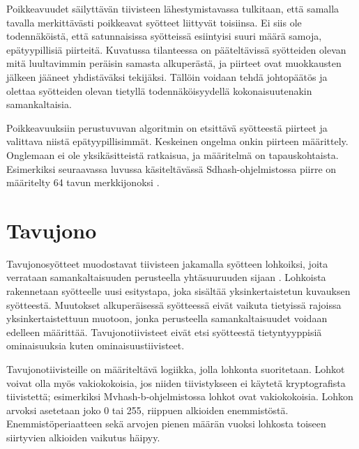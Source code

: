 Poikkeavuudet säilyttävän tiivisteen lähestymistavassa tulkitaan,
että samalla tavalla merkittävästi poikkeavat syötteet liittyvät
toisiinsa. Ei siis ole todennäköistä, että satunnaisissa syötteissä
esiintyisi suuri määrä samoja, epätyypillisiä piirteitä. Kuvatussa
tilanteessa on pääteltävissä syötteiden olevan mitä luultavimmin
peräisin samasta alkuperästä, ja piirteet ovat muokkausten jälkeen
jääneet yhdistäväksi tekijäksi. Tällöin voidaan tehdä johtopäätös
ja olettaa syötteiden olevan tietyllä todennäköisyydellä
kokonaisuutenakin samankaltaisia.

Poikkeavuuksiin perustuvuvan algoritmin on etsittävä
syötteestä piirteet ja valittava niistä epätyypillisimmät.
Keskeinen ongelma onkin piirteen määrittely. Onglemaan
ei ole yksikäsitteistä ratkaisua, ja määritelmä
on tapauskohtaista. Esimerkiksi seuraavassa luvussa
käsiteltävässä Sdhash-ohjelmistossa piirre on määritelty
64 tavun merkkijonoksi \citep{roussev10}.


\section{Tavujono}

Tavujonosyötteet muodostavat tiivisteen jakamalla syötteen lohkoiksi,
joita verrataan samankaltaisuuden perusteella yhtäsuuruuden sijaan
\parencite{martin-perez21}.
Lohkoista rakennetaan syötteelle uusi esitystapa, joka sisältää
yksinkertaistetun kuvauksen syötteestä. Muutokset alkuperäisessä
syötteessä eivät vaikuta tietyissä rajoissa yksinkertaistettuun
muotoon, jonka perusteella samankaltaisuudet voidaan edelleen
määrittää. Tavujonotiivisteet eivät etsi syötteestä tietyntyyppisiä
ominaisuuksia kuten ominaisuustiivisteet.

Tavujonotiivisteille on määriteltävä logiikka, jolla lohkonta
suoritetaan. Lohkot voivat olla myös vakiokokoisia, jos niiden
tiivistykseen ei käytetä kryptografista tiivistettä; esimerkiksi
Mvhash-b-ohjelmistossa lohkot ovat vakiokokoisia. Lohkon arvoksi
asetetaan joko 0 tai 255, riippuen alkioiden enemmistöstä.
Enemmistöperiaatteen sekä arvojen pienen määrän vuoksi lohkosta
toiseen siirtyvien alkioiden vaikutus häipyy.

